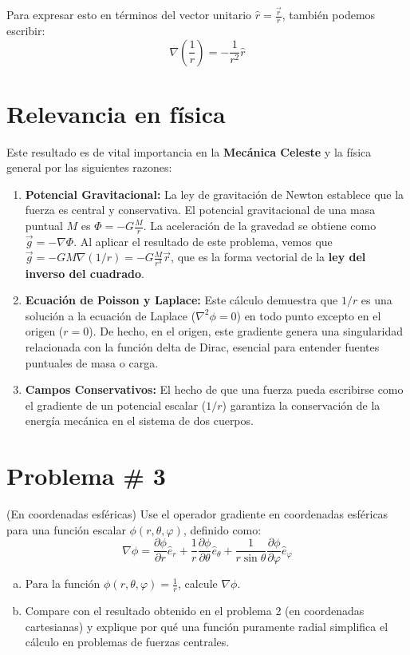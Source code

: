 \documentclass[a4paper]{article}
\begin{document}
Para expresar esto en términos del vector unitario $\hat{r} = \frac{\vec{r}}{r}$, también podemos escribir:
$$ \nabla \left( \frac{1}{r} \right) = -\frac{1}{r^2} \hat{r} $$

\section*{Relevancia en física}

Este resultado es de vital importancia en la \textbf{Mecánica Celeste} y la física general por las siguientes razones:

\begin{enumerate}
    \item \textbf{Potencial Gravitacional:} La ley de gravitación de Newton establece que la fuerza es central y conservativa. El potencial gravitacional de una masa puntual $M$ es $\Phi = -G \frac{M}{r}$. La aceleración de la gravedad se obtiene como $\vec{g} = -\nabla \Phi$. Al aplicar el resultado de este problema, vemos que $\vec{g} = -GM \nabla(1/r) = -G \frac{M}{r^3} \vec{r}$, que es la forma vectorial de la \textbf{ley del inverso del cuadrado}.
    \item \textbf{Ecuación de Poisson y Laplace:} Este cálculo demuestra que $1/r$ es una solución a la ecuación de Laplace ($\nabla^2 \phi = 0$) en todo punto excepto en el origen ($r=0$). De hecho, en el origen, este gradiente genera una singularidad relacionada con la función delta de Dirac, esencial para entender fuentes puntuales de masa o carga.
    \item \textbf{Campos Conservativos:} El hecho de que una fuerza pueda escribirse como el gradiente de un potencial escalar ($1/r$) garantiza la conservación de la energía mecánica en el sistema de dos cuerpos.
\end{enumerate}

\section{Problema \# 3}

(En coordenadas esféricas) Use el operador gradiente en coordenadas esféricas para una función escalar $\phi(r, \theta, \varphi)$, definido como:
$$ \nabla \phi = \frac{\partial \phi}{\partial r} \hat{e}_r + \frac{1}{r} \frac{\partial \phi}{\partial \theta} \hat{e}_\theta + \frac{1}{r \sin \theta} \frac{\partial \phi}{\partial \varphi} \hat{e}_\varphi $$

\begin{enumerate}[a)]
    \item Para la función $\phi(r, \theta, \varphi) = \frac{1}{r}$, calcule $\nabla \phi$.
    \item Compare con el resultado obtenido en el problema 2 (en coordenadas cartesianas) y explique por qué una función puramente radial simplifica el cálculo en problemas de fuerzas centrales.
\end{enumerate}
\end{document}
